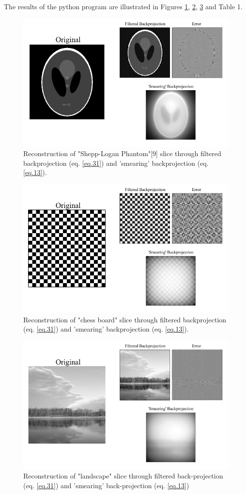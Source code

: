 \documentclass[12pt]{article}
\begin{document}
The results of the python program are illustrated in Figures \ref{fig.phantom}, \ref{fig.chess}, \ref{fig.landscape} and Table 1.
\begin{figure}[hbt]
	\includegraphics[width= .79\textwidth]{application/phantom}
	\caption{Reconstruction of "Shepp-Logan Phantom"[9] slice through filtered backprojection (eq. \ref{eq.31}) and 'smearing' backprojection (eq. \ref{eq.13}).}\label{fig.phantom}
\end{figure}
\begin{figure}[hbt]
	\includegraphics[width= .79\textwidth]{application/chess}
	\caption{Reconstruction of "chess board" slice through filtered backprojection (eq. \ref{eq.31}) and 'smearing' backprojection (eq. \ref{eq.13}).}\label{fig.chess}
\end{figure}
\clearpage
\vfill
\begin{figure}[hbt]
	\includegraphics[width= \textwidth]{application/wildlife}
	\caption{Reconstruction of "landscape" slice through filtered back-projection (eq. \ref{eq.31}) and 'smearing' back-projection (eq. \ref{eq.13})}\label{fig.landscape}
\end{figure}
\end{document}
